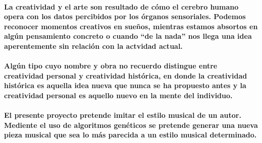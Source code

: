\begin{comment}
  REVIEW: ¿No que es una mezcla (no una expresión) de memorias?
\end{comment}

\paragraph{La creatividad y el arte son resultado de cómo el cerebro humano opera con los datos percibidos por los órganos sensoriales. Podemos reconocer momentos creativos en sueños, mientras estamos absortos en algún pensamiento concreto o cuando ``de la nada'' nos llega una idea aperentemente sin relación con la actvidad actual.}

\paragraph{Algún tipo cuyo nombre y obra no recuerdo\cite{required}
distingue entre creatividad personal
y creatividad histórica, en donde la creatividad histórica es aquella idea nueva que nunca se ha propuesto antes y la creatividad personal es aquello nuevo en la mente del individuo.
}


\paragraph{El presente proyecto pretende imitar el estilo musical de un autor. Mediente el uso de algoritmos genéticos se pretende generar una nueva pieza musical que sea lo más parecida a un estilo musical determinado.}
